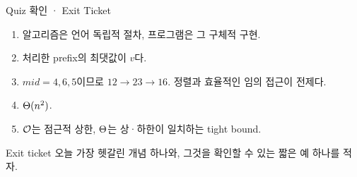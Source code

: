 \begin{frame}{Quiz 확인 · Exit Ticket}
  \begin{enumerate}
    \item 알고리즘은 언어 독립적 절차, 프로그램은 그 구체적 구현.
    \item 처리한 prefix의 최댓값이 $v$다.
    \item $mid=4,6,5$이므로 $12\to23\to16$. 정렬과 효율적인 임의 접근이 전제다.
    \item $\Theta(n^2)$.
    \item $\mathcal{O}$는 점근적 상한, $\Theta$는 상·하한이 일치하는 tight bound.
  \end{enumerate}
  \begin{alertblock}{Exit ticket}
    오늘 가장 헷갈린 개념 하나와, 그것을 확인할 수 있는 짧은 예 하나를 적자.
  \end{alertblock}
\end{frame}
